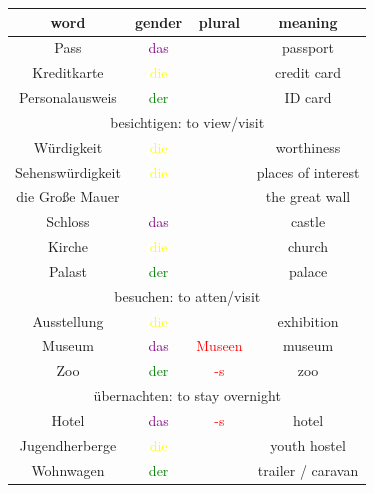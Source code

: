 \begin{center}
    \begin{tabular}{|c|c|c|c|}
        \hline
        \rowcolor{gray}
        word             & gender                  & plural                  & meaning            \\
        \hline
        Pass             & \textcolor{purple}{das} &                         & passport           \\
        Kreditkarte      & \textcolor{yellow}{die} &                         & credit card        \\
        Personalausweis  & \textcolor{green}{der}  &                         & ID card            \\
        \hline
        \multicolumn{4}{|c|}{besichtigen: to view/visit}                                          \\
        \hline
        Würdigkeit       & \textcolor{yellow}{die} &                         & worthiness         \\
        Sehenswürdigkeit & \textcolor{yellow}{die} &                         & places of interest \\
        die Große Mauer  &                         &                         & the great wall     \\
        Schloss          & \textcolor{purple}{das} &                         & castle             \\
        Kirche           & \textcolor{yellow}{die} &                         & church             \\
        Palast           & \textcolor{green}{der}  &                         & palace             \\
        \hline
        \multicolumn{4}{|c|}{besuchen: to atten/visit}                                            \\
        Ausstellung      & \textcolor{yellow}{die} &                         & exhibition         \\
        Museum           & \textcolor{purple}{das} & \textcolor{red}{Museen} & museum             \\
        Zoo              & \textcolor{green}{der}  & \textcolor{red}{-s}     & zoo                \\
        \hline
        \multicolumn{4}{|c|}{übernachten: to stay overnight}                                      \\
        Hotel            & \textcolor{purple}{das} & \textcolor{red}{-s}     & hotel              \\
        Jugendherberge   & \textcolor{yellow}{die} &                         & youth hostel       \\
        Wohnwagen        & \textcolor{green}{der}  &                         & trailer / caravan  \\
        \hline
    \end{tabular}
\end{center}

